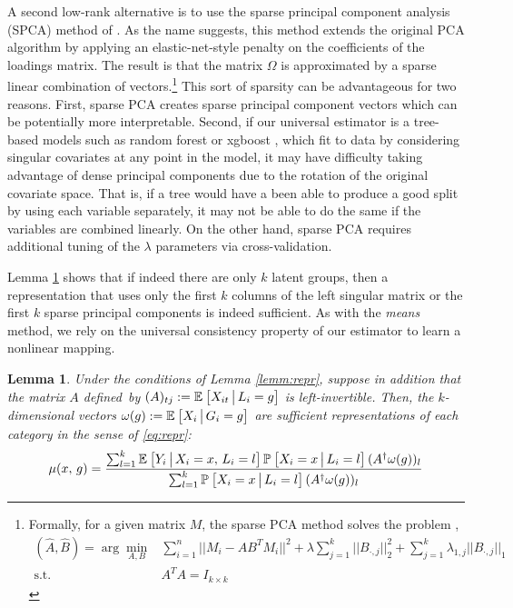 \documentclass{article}
\theoremstyle{plain}
\newtheorem{lemm}[prop]{Lemma}
\theoremstyle{definition}
\theoremstyle{remark}
\begin{document}
A second low-rank alternative is to use the sparse principal component analysis (SPCA) method of \cite{zou2006sparse}. As the name suggests, this method extends the original PCA algorithm by applying an elastic-net-style penalty on the coefficients of the loadings matrix. The result is that the matrix $\Omega$ is approximated by a sparse linear combination of vectors.\footnote{Formally, for a given matrix $M$, the sparse PCA method solves the problem \citep[~eq. 3.12]{zou2006sparse},
\begin{align}
    (\hat{A},\hat{B}) = \arg\min_{A,B} &\sum_{i=1}^n ||M_i - AB^TM_i||^2+ \lambda \sum_{j=1}^k ||B_{\cdot,j} ||_{2}^2 + \sum_{j=1}^k \lambda_{1,j} ||B_{\cdot,j}||_1\\
    \text{s.t.} \quad & A^TA = I_{k \times k}
    \label{eq:sparse_pca}
\end{align}
} This sort of sparsity can be advantageous for two reasons. First, sparse PCA creates sparse principal component vectors which can be potentially more interpretable. Second, if our universal estimator is a tree-based models such as random forest \cite{breiman2001random} or xgboost \cite{chen2016xgboost}, which fit to data by considering singular covariates at any point in the model, it may have difficulty taking advantage of dense principal components due to the rotation of the original covariate space. That is, if a tree would have a been able to produce a good split by using each variable separately, it may not be able to do the same if the variables are combined linearly. On the other hand, sparse PCA requires additional tuning of the $\lambda$ parameters via cross-validation.

Lemma \ref{lemm:lowrank} shows that if indeed there are only $k$ latent groups, then a representation that uses only the first $k$ columns of the left singular matrix or the first $k$ sparse principal components is indeed sufficient. As with the \emph{means} method, we rely on the universal consistency property of our estimator to learn a nonlinear mapping.

\begin{lemm}
\label{lemm:lowrank}
Under the conditions of Lemma \ref{lemm:repr}, suppose in addition that the matrix $A$ defined~by $(A)_{tj} := \mathbb{E}_{}\left[X_{it} \,\big|\, L_{i} = g\right]$
is left-invertible. Then, the $k$-dimensional vectors $\omega(g) := \mathbb{E}_{}\left[X_{i} \,\big|\, G_i = g\right]$ are sufficient representations of each category in the sense of \eqref{eq:repr}:
\begin{equation}
\label{eq:lowrank}
\mu(x, \, g) = \frac{\sum_{l = 1}^k  \mathbb{E}_{}\left[Y_i \,\big|\, X_i = x, \, L_i = l\right] \mathbb{P}_{}\left[X_i = x \,\big|\, L_i = l\right] (A^\dagger \omega(g))_l}{\sum_{l = 1}^k \mathbb{P}_{}\left[X_i = x \,\big|\, L_i = l\right] (A^\dagger \omega(g))_l}
\end{equation}
\end{lemm}
\end{document}
